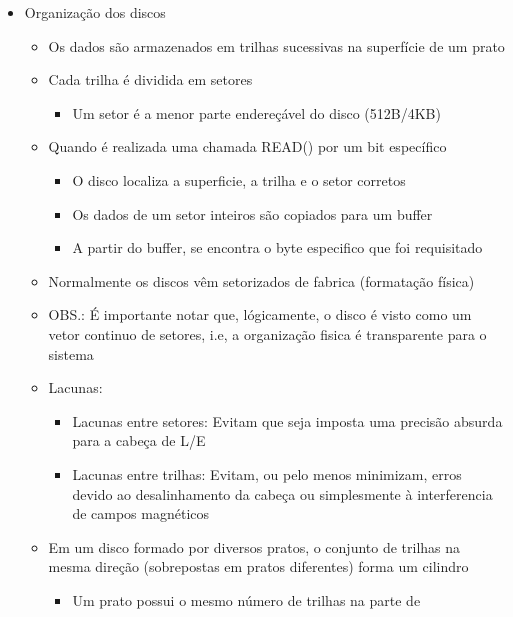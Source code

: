 \documentclass[12pt]{article}
\begin{document}
\begin{itemize}
        \item Organização dos discos
        \begin{itemize}
            \item Os dados são armazenados em trilhas sucessivas na superfície 
            de um prato
            \item Cada trilha é dividida em setores
            \begin{itemize}
                \item Um setor é a menor parte endereçável do disco (512B/4KB)
            \end{itemize}
            \item Quando é realizada uma chamada READ() por um bit específico
            \begin{itemize}
                \item O disco localiza a superficie, a trilha e o setor corretos
                \item Os dados de um setor inteiros são copiados para um buffer
                \item A partir do buffer, se encontra o byte especifico que foi 
                requisitado
            \end{itemize}
            \item Normalmente os discos vêm setorizados de fabrica (formatação 
            física)
            \item OBS.: É importante notar que, lógicamente, o disco é visto 
            como um vetor continuo de setores, i.e, a organização fisica é 
            transparente para o sistema
            \item Lacunas:
            \begin{itemize}
                \item Lacunas entre setores: Evitam que seja imposta uma precisão 
                absurda para a cabeça de L/E
                \item Lacunas entre trilhas: Evitam, ou pelo menos minimizam, 
                erros devido ao desalinhamento da cabeça ou simplesmente à 
                interferencia de campos magnéticos 
            \end{itemize}
            \item Em um disco formado por diversos pratos, o conjunto de 
            trilhas na mesma direção (sobrepostas em pratos diferentes) forma 
            um cilindro
            \begin{itemize}
                \item Um prato possui o mesmo número de trilhas na parte de 

\end{itemize}
\end{itemize}
\end{itemize}
\end{document}
